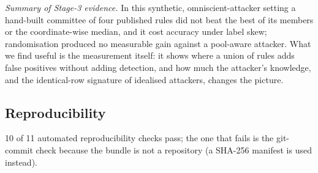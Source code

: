 \documentclass[conference]{IEEEtran}
\begin{document}
\emph{Summary of Stage-3 evidence.} In this synthetic, omniscient-attacker setting a hand-built committee of four published rules did not beat the best of its members or the coordinate-wise median, and it cost accuracy under label skew; randomisation produced no measurable gain against a pool-aware attacker. What we find useful is the measurement itself: it shows where a union of rules adds false positives without adding detection, and how much the attacker's knowledge, and the identical-row signature of idealised attackers, changes the picture.
\subsection{Reproducibility}
10 of 11 automated reproducibility checks pass; the one that fails is the git-commit check because the bundle is not a repository (a SHA-256 manifest is used instead).
\end{document}
